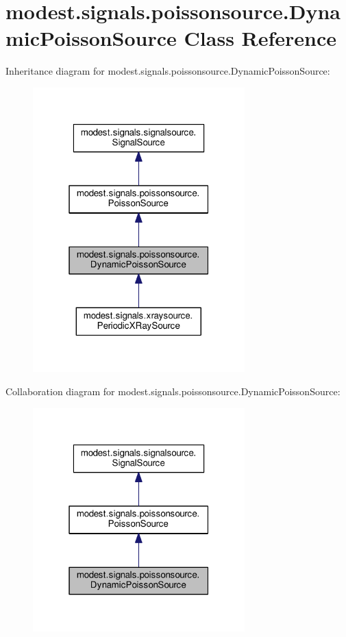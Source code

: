 \hypertarget{classmodest_1_1signals_1_1poissonsource_1_1DynamicPoissonSource}{}\section{modest.\+signals.\+poissonsource.\+Dynamic\+Poisson\+Source Class Reference}
\label{classmodest_1_1signals_1_1poissonsource_1_1DynamicPoissonSource}


Inheritance diagram for modest.\+signals.\+poissonsource.\+Dynamic\+Poisson\+Source\+:\nopagebreak
\begin{figure}[H]
\begin{center}
\leavevmode
\includegraphics[width=232pt]{classmodest_1_1signals_1_1poissonsource_1_1DynamicPoissonSource__inherit__graph}
\end{center}
\end{figure}


Collaboration diagram for modest.\+signals.\+poissonsource.\+Dynamic\+Poisson\+Source\+:\nopagebreak
\begin{figure}[H]
\begin{center}
\leavevmode
\includegraphics[width=232pt]{classmodest_1_1signals_1_1poissonsource_1_1DynamicPoissonSource__coll__graph}
\end{center}
\end{figure}
